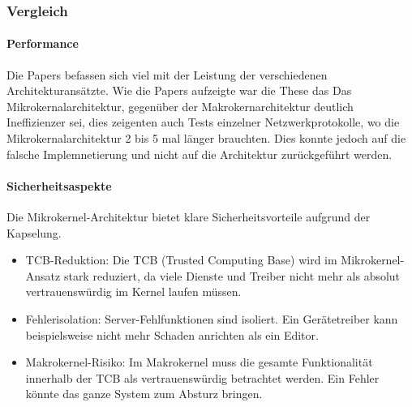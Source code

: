 \documentclass{article}
\begin{document}
\subsubsection*{Vergleich}

\paragraph{Performance}

Die Papers befassen sich viel mit der Leistung der verschiedenen Architekturansätzte. Wie die Papers aufzeigte war die These das Das Mikrokernalarchitektur, gegenüber der Makrokernarchitektur deutlich
Ineffizienzer sei, dies zeigenten auch Tests einzelner Netzwerkprotokolle, wo die Mikrokernalarchitektur 2 bis 5 mal länger brauchten. Dies konnte jedoch auf die falsche Implemnetierung und nicht auf die Architektur 
zurückgeführt werden.


\begin{table}[h]
\centering
{}
\caption{Vergleich zwischen Makrokernel und Mikrokernel-Architekturen.}
\label{tab:kernel-vergleich}
\end{table}

\paragraph{Sicherheitsaspekte}
Die Mikrokernel-Architektur bietet klare Sicherheitsvorteile aufgrund der Kapselung.
\begin{itemize}
    \item TCB-Reduktion: Die TCB (Trusted Computing Base) wird im Mikrokernel-Ansatz stark reduziert, da viele Dienste und Treiber nicht mehr als absolut vertrauenswürdig im Kernel laufen müssen.
    \item Fehlerisolation: Server-Fehlfunktionen sind isoliert. Ein Gerätetreiber kann beispielsweise nicht mehr Schaden anrichten als ein Editor.
    \item Makrokernel-Risiko: Im Makrokernel muss die gesamte Funktionalität innerhalb der TCB als vertrauenswürdig betrachtet werden. Ein Fehler könnte das ganze System zum Absturz bringen.
\end{itemize}


\end{document}
